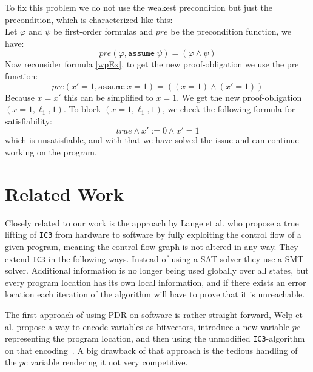 \documentclass[11pt, a4paper, BCOR=10mm, ngerman]{scrbook}
\begin{document}
To fix this problem we do not use the weakest precondition but just the precondition, which is characterized like this: \\
Let $\varphi$ and $\psi$ be first-order formulas and $pre$ be the precondition function, we have: 
\begin{equation*}
pre(\varphi, \texttt{assume}\ \psi) = (\varphi \land \psi)
\end{equation*}
Now reconsider formula \eqref{wpEx}, to get the new proof-obligation we use the pre function: 
\begin{equation*}
		pre(x' = 1, \texttt{assume}\ x = 1) = ((x = 1) \land (x' = 1))
\end{equation*}
Because $x = x'$ this can be simplified to $x = 1$. We get the new proof-obligation $(x = 1, \ell_1, 1)$.
To block $(x = 1, \ell_1, 1)$, we check the following formula for satisfiability: 
\begin{equation*}
true\land x' := 0 \land x' = 1
\end{equation*}
which is unsatisfiable, and with that we have solved the issue and can continue working on the program. \par

\chapter{Related Work}

Closely related to our work is the approach by Lange et al. \cite{DBLP:conf/fmcad/0001NN15} who propose a true lifting of \texttt{IC3} from hardware to software by fully exploiting the control flow of a given program, meaning the control flow graph is not altered in any way. They extend \texttt{IC3} in the following ways. Instead of using a SAT-solver they use a SMT-solver. Additional information is no longer being used globally over all states, but every program location has its own local information, and if there exists an error location each iteration of the algorithm will have to prove that it is unreachable. \par

The first approach of using PDR on software is rather straight-forward, Welp et al. propose a way to encode variables as bitvectors, introduce a new variable $pc$ representing the program location, and then using the unmodified \texttt{IC3}-algorithm on that encoding~\cite{DBLP:conf/date/WelpK13}. A big drawback of that approach is the tedious handling of the $pc$ variable rendering it not very competitive.
\end{document}
